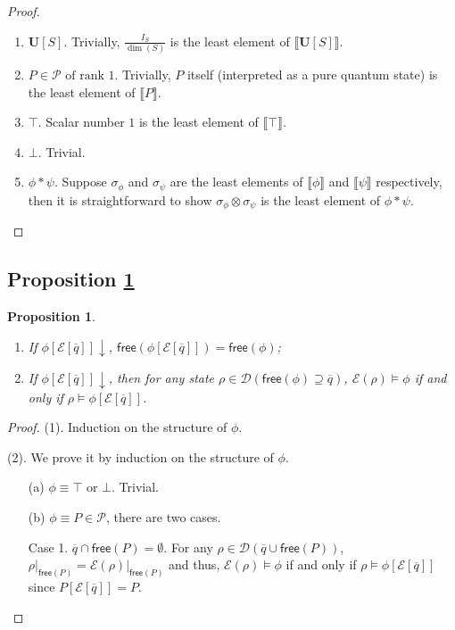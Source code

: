 \documentclass[conference,compsoc, 10pt]{IEEEtran}
\newtheorem{proposition}{Proposition}[section]
\newcommand {\qbar} {{\overline{q}}}
\newcommand {\cD } {{\mathcal{D}}}
\newcommand {\cP } {{\mathcal{P}}}
\newcommand {\cE } {{\mathcal{E}}}
\newcommand{\Mexist}{{\downarrow}}
\newcommand {\free }[1] {{\mathsf{free}\left(#1\right)}}
\newcommand {\rt }[2] {{\left.{#1}\right|_{#2}}}
\newcommand {\unia } {{\mathbf{U}}}
\newcommand {\sem}[1] {\llbracket#1\rrbracket}
\begin{document}
\begin{appendices}
		\begin{proof}
			\begin{enumerate}
				\item $\unia[S]$. Trivially, $\frac{I_S}{\dim(S)}$ is the least element of $\sem{\unia[S]}$.
				\item $P\in\cP \text{\ of rank 1}$. Trivially, $P$ itself (interpreted as a pure quantum state) is the least element of $\sem{P}$.
				\item $\top$. Scalar number $1$ is the least element of $\sem{\top}$.
				\item $\bot$. Trivial.
				\item $\phi\ast\psi$. Suppose $\sigma_\phi$ and $\sigma_\psi$ are the least elements of  $\sem{\phi}$ and  $\sem{\psi}$ respectively, then it is straightforward to show $\sigma_\phi\otimes \sigma_\psi$ is the least element of $\phi\ast\psi$.
			\end{enumerate}
		\end{proof}
		
		\subsection{Proposition \ref{prop modification qo}}
		
		\begin{proposition}
			\label{prop modification qo}
			\begin{enumerate}
				\item If $\phi[\cE[\qbar]]\Mexist$, $\free{\phi[\cE[\qbar]]} = \free {\phi}$;
				\item 
				If $\phi[\cE[\qbar]]\Mexist$, then for any state $\rho\in\cD(\free{\phi}\supseteq\qbar)$, $\cE(\rho)\models\phi$ if and only if $\rho\models \phi[\cE[\qbar]]$.
			\end{enumerate}
		\end{proposition}
		\begin{proof}
			\noindent	(1). Induction on the structure of $\phi$.
			
			\noindent	(2). We prove it by induction on the structure of $\phi$.
			\begin{enumerate}
				\item[(a)] $\phi\equiv\top$ or $\bot$. Trivial.
				\item[(b)] $\phi\equiv P\in\cP$,  there are two cases.
				
				Case 1. $\qbar\cap\free{P} = \emptyset$. For any $\rho\in\cD(\qbar\cup\free{P})$, $\rt{\rho}{\free{P}} = \rt{\cE(\rho)}{\free{P}}$ and thus, $\cE(\rho)\models\phi$ if and only if $\rho\models \phi[\cE[\qbar]]$ since $P[\cE[\qbar]] = P$.
				

\end{enumerate}
\end{proof}
\end{appendices}
\end{document}
